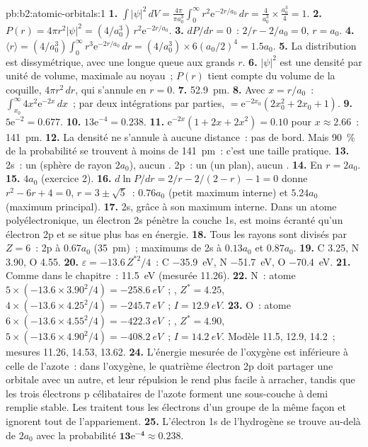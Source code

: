 \begin{solution}{pb:b2:atomic-orbitals:1}
\textbf{1.} $\int|\psi|^2\,dV = \frac{4\pi}{\pi a_0^3}\int_0^\infty r^2\mathrm e^{-2r/a_0}\,dr =
\frac{4}{a_0^3} \times \frac{a_0^3}{4} = 1$.
\textbf{2.} $P(r) = 4\pi r^2|\psi|^2 = (4/a_0^3)\,r^2\mathrm e^{-2r/a_0}$.
\textbf{3.} $dP/dr = 0$~: $2/r - 2/a_0 = 0$, $r = a_0$.
\textbf{4.} $\langle r\rangle = (4/a_0^3)\int_0^\infty r^3\mathrm e^{-2r/a_0}\,dr = (4/a_0^3)
\times 6(a_0/2)^4 = 1.5a_0$.
\textbf{5.} La distribution est dissymétrique, avec une longue queue aux grands $r$.
\textbf{6.} $|\psi|^2$ est une densité par unité de volume, maximale au noyau~; $P(r)$
tient compte du volume de la coquille, $4\pi r^2\,dr$, qui s'annule en $r = 0$.
\textbf{7.} \qty{52.9}{pm}.
\textbf{8.} Avec $x = r/a_0$~: $\int_{x_0}^\infty 4x^2\mathrm e^{-2x}\,dx$~; par deux intégrations par parties,
$= \mathrm e^{-2x_0}(2x_0^2 + 2x_0 + 1)$.
\textbf{9.} $5\mathrm e^{-2} = 0.677$.
\textbf{10.} $13\mathrm e^{-4} = 0.238$.
\textbf{11.} $\mathrm e^{-2x}(1 + 2x + 2x^2) = 0.10$ pour $x \approx 2.66$~: \qty{141}{pm}.
\textbf{12.} La densité ne s'annule à aucune distance~: pas de bord. Mais 90~\% de la
probabilité se trouvent à moins de \qty{141}{pm}~: c'est une taille pratique.
\textbf{13.} 2s~: un  (sphère de rayon $2a_0$), aucun . 2p~: un
 (un plan), aucun .
\textbf{14.} En $r = 2a_0$.
\textbf{15.} $4a_0$ (exercice 2).
\textbf{16.} $d\ln P/dr = 2/r - 2/(2 - r) - 1 = 0$ donne $r^2 - 6r + 4 = 0$, $r = 3 \pm \sqrt5$~:
$0.76a_0$ (petit maximum interne) et $5.24a_0$ (maximum principal).
\textbf{17.} 2s, grâce à son maximum interne. Dans un atome polyélectronique, un électron 2s
pénètre la couche 1s, est moins écranté qu'un électron 2p et se situe plus bas en
énergie.
\textbf{18.} Tous les rayons sont divisés par $Z = 6$~: 2p à $0.67a_0$ (\qty{35}{pm})~; maximums de 2s
à $0.13a_0$ et $0.87a_0$.
\textbf{19.} C 3.25, N 3.90, O 4.55.
\textbf{20.} $\varepsilon = -13.6\,Z^{*2}/4$~: C \qty{-35.9}{eV}, N \qty{-51.7}{eV}, O
\qty{-70.4}{eV}.
\textbf{21.} Comme dans le chapitre~: \qty{11.5}{eV} (mesurée 11.26).
\textbf{22.} N~: atome $5 \times (-13.6 \times 3.90^2/4) = \qty{-258.6}{eV}$~; , $Z^* =
4.25$, $4 \times (-13.6 \times 4.25^2/4) = \qty{-245.7}{eV}$~; $I = \qty{12.9}{eV}$.
\textbf{23.} O~: atome $6 \times (-13.6 \times 4.55^2/4) = \qty{-422.3}{eV}$~; , $Z^* =
4.90$, $5 \times (-13.6 \times 4.90^2/4) = \qty{-408.2}{eV}$~; $I = \qty{14.2}{eV}$. Modèle
11.5, 12.9, 14.2~; mesures 11.26, 14.53, 13.62.
\textbf{24.} L'énergie mesurée de l'oxygène est inférieure à celle de l'azote~: dans
l'oxygène, le quatrième électron 2p doit partager une orbitale avec un autre, et leur
répulsion le rend plus facile à arracher, tandis que les trois électrons p célibataires de l'azote
forment une sous-couche à demi remplie stable. Les  traitent tous les électrons d'un groupe
de la même façon et ignorent tout de l'appariement.
\textbf{25.} L'électron 1s de l'hydrogène se trouve au-delà de $2a_0$ avec la probabilité
$\boldsymbol{13\mathrm e^{-4} \approx 0.238}$.
\end{solution}
